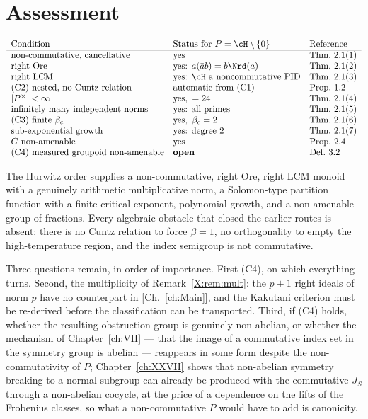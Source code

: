 \section{Assessment}

\[
\begin{array}{lll}
\text{Condition} & \text{Status for }P=\cH\setminus\{0\} & \text{Reference}\\\hline
\text{non-commutative, cancellative} & \text{yes} & \text{Thm.~2.1(1)}\\
\text{right Ore} & \text{yes: }a(\bar ab)=b\Nrd(a) & \text{Thm.~2.1(2)}\\
\text{right LCM} & \text{yes: }\cH\ \text{a noncommutative PID} & \text{Thm.~2.1(3)}\\
\text{(C2) nested, no Cuntz relation} & \text{automatic from (C1)} & \text{Prop.~1.2}\\
|P^\times|<\infty & \text{yes},\ =24 & \text{Thm.~2.1(4)}\\
\text{infinitely many independent norms} & \text{yes: all primes} & \text{Thm.~2.1(5)}\\
\text{(C3) finite }\beta_c & \text{yes},\ \beta_c=2 & \text{Thm.~2.1(6)}\\
\text{sub-exponential growth} & \text{yes: degree }2 & \text{Thm.~2.1(7)}\\
G\ \text{non-amenable} & \text{yes} & \text{Prop.~2.4}\\
\text{(C4) measured groupoid non-amenable} & \textbf{open} & \text{Def.~3.2}
\end{array}
\]

The Hurwitz order supplies a non-commutative, right Ore, right LCM monoid with a genuinely
arithmetic multiplicative norm, a Solomon-type partition function with a finite critical
exponent, polynomial growth, and a non-amenable group of fractions. Every algebraic obstacle
that closed the earlier routes is absent: there is no Cuntz relation to force $\beta=1$, no
orthogonality to empty the high-temperature region, and the index semigroup is not
commutative.

Three questions remain, in order of importance. First (C4), on which everything turns. Second,
the multiplicity of Remark~\ref{X:rem:mult}: the $p+1$ right ideals of norm $p$ have no
counterpart in [Ch.~\ref{ch:Main}], and the Kakutani criterion must be re-derived before the
classification can be transported. Third, if (C4) holds, whether the resulting obstruction
group is genuinely non-abelian, or whether the mechanism of Chapter~\ref{ch:VII} --- that the image of
a commutative index set in the symmetry group is abelian --- reappears in some form despite
the non-commutativity of $P$; Chapter~\ref{ch:XXVII} shows that non-abelian symmetry breaking to a
normal subgroup can already be produced with the commutative $J_S$ through a non-abelian
cocycle, at the price of a dependence on the lifts of the Frobenius classes, so what a
non-commutative $P$ would have to add is canonicity.

